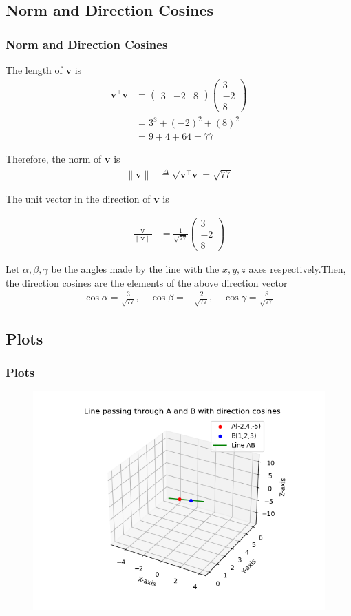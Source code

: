 \documentclass{beamer}
\providecommand{\brak}[1]{\ensuremath{\left(#1\right)}}
\theoremstyle{remark}
\providecommand{\norm}[1]{\lVert#1\rVert}
\newcommand{\myvec}[1]{\ensuremath{\begin{pmatrix}#1\end{pmatrix}}}
\let\vec\mathbf
\numberwithin{equation}{section}
\begin{document}
\subsection{Norm and Direction Cosines}
\begin{frame}
\frametitle{Norm and Direction Cosines}
 The length of $\vec{v}$ is
\begin{align*}
\vec{v}^\top \vec{v} &= \myvec{3 & -2 & 8}\myvec{3 \\ -2 \\ 8} \\
&= 3^3 + \brak{-2}^2 + \brak{8}^2 \\
&= 9 + 4 + 64 = 77
\end{align*}

Therefore, the norm of $\vec{v}$ is
\begin{align*}
\norm{\vec{v}} &\overset{\Delta}{=} \sqrt{\vec{v}^\top \vec{v}} = \sqrt{77} 
\end{align*} 

The unit vector in the direction of $\vec{v}$ is  

\begin{align*} 
\frac{\vec{v}}{\norm{\vec{v}}}
&= \frac{1}{\sqrt{77}}\myvec{3 \\ -2 \\ 8}
\end{align*}
\end{frame}
\begin{frame}
Let $\alpha,\beta,\gamma$ be the angles made by the line with the $x,y,z$ axes respectively.Then, the direction cosines are the elements of the above direction vector
\begin{align*}
\cos\alpha = \frac{3}{\sqrt{77}}, \quad
\cos\beta = -\frac{2}{\sqrt{77}}, \quad
\cos\gamma = \frac{8}{\sqrt{77}}
\end{align*}

\end{frame}
\subsection{Plots}
\begin{frame}
\frametitle{Plots}
\begin{figure}
\centering
\includegraphics[width=0.7\columnwidth]{figs/fig_vector.png}
\caption{}
\label{fig:placeholder}
\end{figure}
\end{frame}
\end{document}
